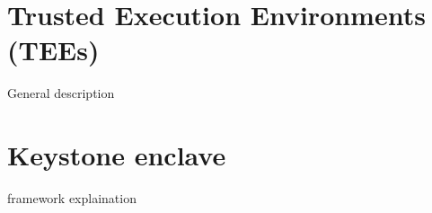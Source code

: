 \section{Trusted Execution Environments (TEEs)}
General description
\section{Keystone enclave}
framework explaination

